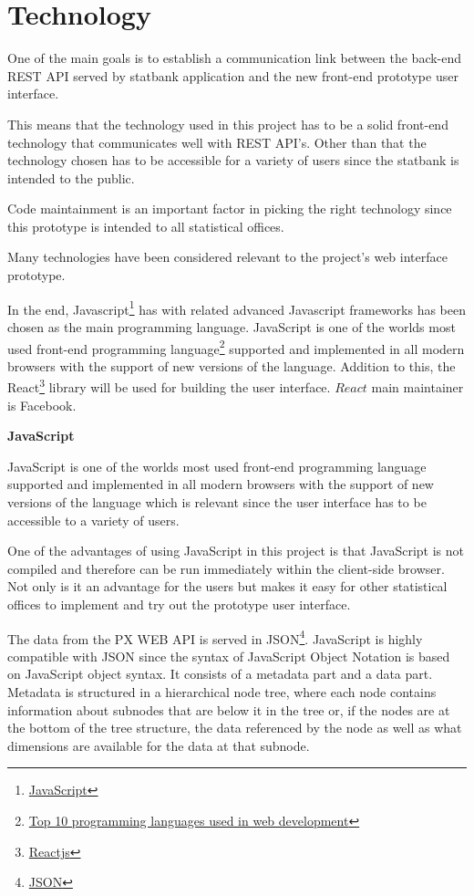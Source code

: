 \section{Technology}
One of the main goals is to establish a communication link between the back-end REST API served by statbank application and the new front-end prototype user interface. 

This means that the technology used in this project has to be a solid front-end technology that communicates well with REST API's. Other than that the technology chosen has to be accessible for a variety of users since the statbank is intended to the public. 

Code maintainment is an important factor in picking the right technology since this prototype is intended to all statistical offices.

Many technologies have been considered relevant to the project's web interface prototype.

In the end, Javascript\footnote{\href{https://www.javascript.com/}{JavaScript}\label{javascript}} has with related advanced Javascript frameworks has been chosen as the main programming language. JavaScript is one of the worlds most used front-end programming language\footnote{\href{http://blog.stoneriverelearning.com/top-10-programming-languages-used-in-web-development/}{Top 10 programming languages used in web development}\label{jstop10}} supported and implemented in all modern browsers with the support of new versions of the language. Addition to this, the React\footnote{\href{https://reactjs.org/}{Reactjs}\label{react}} library will be used for building the user interface. $React$ main maintainer is Facebook.

\bigskip
\centerline{\textbf{JavaScript}}
\medskip

JavaScript is one of the worlds most used front-end programming language supported and implemented in all modern browsers with the support of new versions of the language which is relevant since the user interface has to be accessible to a variety of users.

One of the advantages of using JavaScript in this project is that JavaScript is not compiled and therefore can be run immediately within the client-side browser. Not only is it an advantage for the users but makes it easy for other statistical offices to implement and try out the prototype user interface.  

The data from the PX WEB API is served in JSON\footnote{\href{https://json.org/}{JSON}\label{json}}. JavaScript is highly compatible with JSON since the syntax of JavaScript Object Notation is based on JavaScript object syntax. It  consists of a metadata part and a data part. Metadata is structured in a hierarchical node tree, where each node contains information about subnodes that are below it in the tree or, if the nodes are at the bottom of the tree structure, the data referenced by the node as well as what dimensions are available for the data at that subnode.

